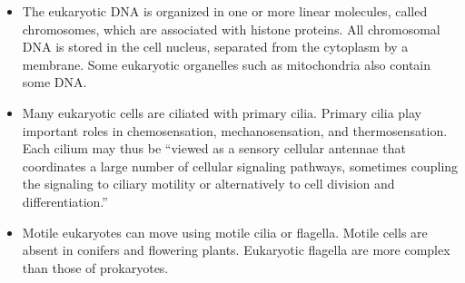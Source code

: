 \begin{itemize}
\tightlist
\item
  The eukaryotic DNA is organized in one or more linear molecules, called chromosomes, which are associated with histone proteins. All chromosomal DNA is stored in the cell nucleus, separated from the cytoplasm by a membrane. Some eukaryotic organelles such as mitochondria also contain some DNA.
\item
  Many eukaryotic cells are ciliated with primary cilia. Primary cilia play important roles in chemosensation, mechanosensation, and thermosensation. Each cilium may thus be ``viewed as a sensory cellular antennae that coordinates a large number of cellular signaling pathways, sometimes coupling the signaling to ciliary motility or alternatively to cell division and differentiation.''
\item
  Motile eukaryotes can move using motile cilia or flagella. Motile cells are absent in conifers and flowering plants. Eukaryotic flagella are more complex than those of prokaryotes.
\end{itemize}


